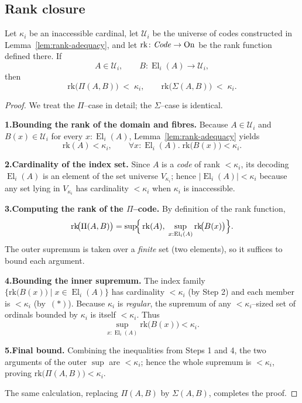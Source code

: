 \documentclass[a4paper,11pt]{article}
\newcommand{\El}{\operatorname{El}}          %
\begin{document}


\subsection{Rank closure}
\begin{lemma}\label{lem:rank-closure}
Let\/ $\kappa_{i}$ be an inaccessible cardinal, let\/
$\mathcal U_{i}$ be the universe of codes constructed in
Lemma~\ref{lem:rank-adequacy}, and let
\(
  \mathrm{rk}\colon\text{\emph{Code}}\to\mathrm{On}
\)
be the rank function defined there.
If
\[
  A\in\mathcal U_{i},
  \qquad
  B\colon \El_{i}(A)\longrightarrow\mathcal U_{i},
\]
then
\[
  \mathrm{rk}\!\bigl(\Pi(A,B)\bigr)
  \;<\;\kappa_{i},
  \qquad
  \mathrm{rk}\!\bigl(\Sigma(A,B)\bigr)
  \;<\;\kappa_{i}.
\]
\end{lemma}
\begin{proof}
We treat the $\Pi$–case in detail; the $\Sigma$–case is identical.

\medskip\noindent
\textbf{1.\;Bounding the rank of the domain and fibres.}
Because $A\in\mathcal U_{i}$ and
$B(x)\in\mathcal U_{i}$ for every $x:\El_{i}(A)$,  
Lemma~\ref{lem:rank-adequacy} yields
\[
  \mathrm{rk}(A)<\kappa_{i},
  \qquad
  \forall x:\El_{i}(A).\;
    \mathrm{rk}\!\bigl(B(x)\bigr)<\kappa_{i}.
\tag{\(\ast\)}
\]

\medskip\noindent
\textbf{2.\;Cardinality of the index set.}
Since $A$ is a \emph{code} of rank $<\kappa_{i}$,
its decoding $\El_{i}(A)$ is an element of the set universe
$V_{\kappa_{i}}$; hence
\(
  \bigl|\El_{i}(A)\bigr|<\kappa_{i}
\)
because any set lying in $V_{\kappa_{i}}$ has cardinality
$<\kappa_{i}$ when $\kappa_{i}$ is inaccessible.

\medskip\noindent
\textbf{3.\;Computing the rank of the $\Pi$–code.}
By definition of the rank function,
\[
  \mathrm{rk}\!\bigl(\Pi(A,B)\bigr)
  =\sup\!\Bigl\{\,
      \mathrm{rk}(A),\;
      \sup_{x:\El_{i}(A)}
         \mathrm{rk}\!\bigl(B(x)\bigr)
    \Bigr\}.
\]
The outer supremum is taken over a \emph{finite} set
(two elements), so it suffices to bound each argument.

\medskip\noindent
\textbf{4.\;Bounding the inner supremum.}
The index family
\(
  \{\mathrm{rk}\!\bigl(B(x)\bigr)\mid x\in\El_{i}(A)\}
\)
has cardinality $<\kappa_{i}$ (by Step 2) and each member is
$<\kappa_{i}$ (by~\((\ast)\)).
Because $\kappa_{i}$ is \emph{regular},
the supremum of any $<\!\kappa_{i}$–sized set of ordinals
bounded by $\kappa_{i}$ is itself $<\kappa_{i}$.
Thus
\[
  \sup_{x:\El_{i}(A)}
       \mathrm{rk}\!\bigl(B(x)\bigr)
  <\kappa_{i}.
\]

\medskip\noindent
\textbf{5.\;Final bound.}
Combining the inequalities from Steps 1 and 4, the two arguments of
the outer $\sup$ are $<\kappa_{i}$; hence the whole supremum is
$<\kappa_{i}$, proving
\(
  \mathrm{rk}\!\bigl(\Pi(A,B)\bigr)<\kappa_{i}.
\)

\medskip
The same calculation, replacing
$\Pi(A,B)$ by $\Sigma(A,B)$, completes the proof.
\end{proof}
\end{document}
